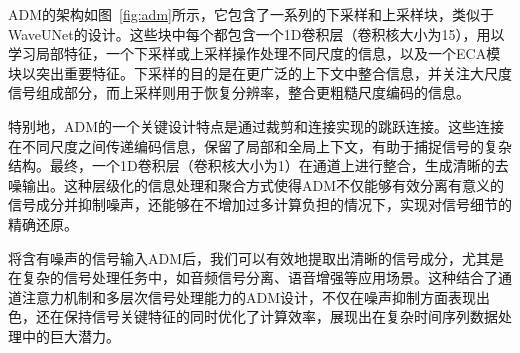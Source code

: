 ADM的架构如图~\ref{fig:adm}所示，它包含了一系列的下采样和上采样块，类似于WaveUNet的设计。这些块中每个都包含一个1D卷积层（卷积核大小为15），用以学习局部特征，一个下采样或上采样操作处理不同尺度的信息，以及一个ECA模块以突出重要特征。下采样的目的是在更广泛的上下文中整合信息，并关注大尺度信号组成部分，而上采样则用于恢复分辨率，整合更粗糙尺度编码的信息。

特别地，ADM的一个关键设计特点是通过裁剪和连接实现的跳跃连接。这些连接在不同尺度之间传递编码信息，保留了局部和全局上下文，有助于捕捉信号的复杂结构。最终，一个1D卷积层（卷积核大小为1）在通道上进行整合，生成清晰的去噪输出。这种层级化的信息处理和聚合方式使得ADM不仅能够有效分离有意义的信号成分并抑制噪声，还能够在不增加过多计算负担的情况下，实现对信号细节的精确还原。

将含有噪声的信号输入ADM后，我们可以有效地提取出清晰的信号成分，尤其是在复杂的信号处理任务中，如音频信号分离、语音增强等应用场景。这种结合了通道注意力机制和多层次信号处理能力的ADM设计，不仅在噪声抑制方面表现出色，还在保持信号关键特征的同时优化了计算效率，展现出在复杂时间序列数据处理中的巨大潜力。





